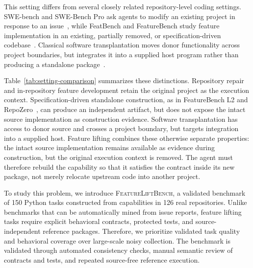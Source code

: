 \documentclass[acmsmall,screen,review,anonymous]{acmart}
\newcommand{\flb}{\textsc{FeatureLiftBench}\xspace}
\begin{document}
This setting differs from several closely related repository-level coding
settings. SWE-bench and SWE-Bench Pro ask agents to modify an existing project
in response to an issue~\cite{jimenez2024swebench,deng2025swebenchpro}, while
FeatBench and FeatureBench study feature implementation in an existing,
partially removed, or specification-driven codebase~\cite{chen2026featbench,zhou2026featurebench}.
Classical software transplantation moves donor functionality across project
boundaries, but integrates it into a supplied host program rather than producing
a standalone package~\cite{barr2015transplantation}.

Table~\ref{tab:setting-comparison} summarizes these distinctions. Repository
repair and in-repository feature development retain the original project as the
execution context. Specification-driven standalone construction, as in
FeatureBench L2 and RepoZero~\cite{zhou2026featurebench,zhang2026repozero}, can
produce an independent artifact, but does not expose the intact source implementation as
construction evidence. Software transplantation has access to donor source and
crosses a project boundary, but targets integration into a supplied host.
Feature lifting combines these otherwise separate properties: the intact source
implementation remains available as evidence during construction, but the
original execution context is removed. The agent must therefore rebuild the
capability so that it satisfies the contract inside its new package, not merely
relocate upstream code into another project.

To study this problem, we introduce \flb, a validated benchmark of
150 Python tasks constructed from capabilities in 126 real repositories.
Unlike benchmarks that can be automatically mined from issue reports, feature
lifting tasks require explicit behavioral contracts, protected tests, and
source-independent reference packages. Therefore, we
prioritize validated task quality and behavioral coverage over large-scale noisy
collection. The benchmark is validated through automated consistency checks, manual semantic review of
contracts and tests, and repeated source-free reference execution.
\end{document}
